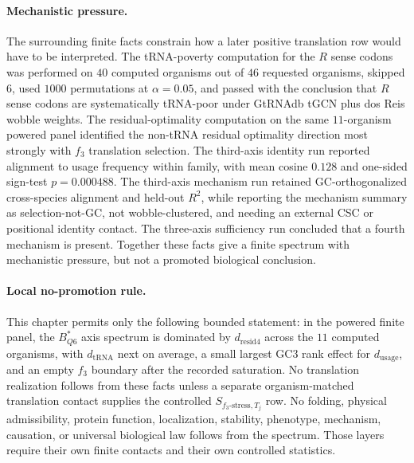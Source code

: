 \paragraph{Mechanistic pressure.}
The surrounding finite facts constrain how a later positive translation row would have to be interpreted.  The tRNA-poverty computation for the $R$ sense codons was performed on $40$ computed organisms out of $46$ requested organisms, skipped $6$, used $1000$ permutations at $\alpha=0.05$, and passed with the conclusion that $R$ sense codons are systematically tRNA-poor under GtRNAdb tGCN plus dos Reis wobble weights.  The residual-optimality computation on the same $11$-organism powered panel identified the non-tRNA residual optimality direction most strongly with $f_3$ translation selection.  The third-axis identity run reported alignment to usage frequency within family, with mean cosine $0.128$ and one-sided sign-test $p=0.000488$.  The third-axis mechanism run retained GC-orthogonalized cross-species alignment and held-out $R^2$, while reporting the mechanism summary as selection-not-GC, not wobble-clustered, and needing an external CSC or positional identity contact.  The three-axis sufficiency run concluded that a fourth mechanism is present.  Together these facts give a finite spectrum with mechanistic pressure, but not a promoted biological conclusion.

\paragraph{Local no-promotion rule.}
This chapter permits only the following bounded statement: in the powered finite panel, the $B^{\ast}_{Q6}$ axis spectrum is dominated by $d_{\mathrm{resid4}}$ across the $11$ computed organisms, with $d_{\mathrm{tRNA}}$ next on average, a small largest GC3 rank effect for $d_{\mathrm{usage}}$, and an empty $f_3$ boundary after the recorded saturation.  No translation realization follows from these facts unless a separate organism-matched translation contact supplies the controlled $S_{f_3\text{-stress},T_j}$ row.  No folding, physical admissibility, protein function, localization, stability, phenotype, mechanism, causation, or universal biological law follows from the spectrum.  Those layers require their own finite contacts and their own controlled statistics.